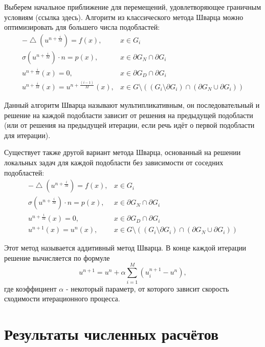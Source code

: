 \documentclass[a4paper]{article}
\begin{document}
Выберем начальное приближение для перемещений, удовлетворяющее граничным условиям (ссылка здесь). Алгоритм из классического метода Шварца можно оптимизировать для большего числа подобластей:
\begin{equation*}
\begin{array}{rl}
-\bigtriangleup \! (u^{n+\frac{i}{M}}) = f(x), & x \in G_i \\
\sigma(u^{n+\frac{i}{M}}) \cdot n = p(x), & x \in \partial G_N \cap \partial G_i \\
u^{n+\frac{i}{M}}(x) = 0, & x \in \partial G_D \cap \partial G_i \\ 
u^{n+\frac{i}{M}}(x) = u^{n+\frac{(i - 1)}{M}}(x), & x \in G \setminus ((G_i \setminus \partial G_i) \cap (\partial G_N \cup \partial G_i))
\end{array}
\end{equation*}

Данный алгоритм Шварца называют мультипликативным, он последовательный и решение на каждой подобласти зависит от решения на предыдущей подобласти (или от решения на предыдущей итерации, если речь идёт о первой подобласти для итерации).

Существует также другой вариант метода Шварца, основанный на решении локальных задач для каждой подобласти без зависимости от соседних подобластей:
\begin{equation*}
\begin{array}{rl}
-\bigtriangleup \! (u^{n+\frac{i}{M}}) = f(x), & x \in G_i \\
\sigma(u^{n+\frac{i}{M}}) \cdot n = p(x), & x \in \partial G_N \cap \partial G_i \\
u^{n+\frac{i}{M}}(x) = 0, & x \in \partial G_D \cap \partial G_i \\ 
u^{n+1}(x) = u^{n}(x), & x \in G \setminus ((G_i \setminus \partial G_i) \cap (\partial G_N \cup \partial G_i))
\end{array}
\end{equation*}

Этот метод называется аддитивный метод Шварца. В конце каждой итерации решение вычисляется по формуле 
\begin{equation*}
u^{n+1} = u^{n} + \alpha \sum_{i=1}^{M} (u_i^{n+1} - u^{n}),
\end{equation*}
где коэффициент $\alpha$ - некоторый параметр, от которого зависит скорость сходимости итерационного процесса. 

\newpage

\section{Результаты численных расчётов}
\end{document}
